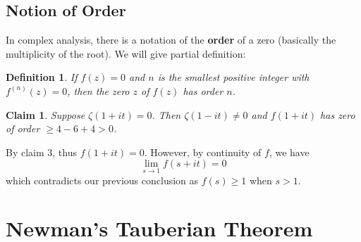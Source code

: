 \documentclass[12pt]{article}
\newtheorem*{definition}{Definition}
\newtheorem{claim}{Claim}
\begin{document}
\subsection{Notion of Order}
In complex analysis, there is a notation of the \textbf{order} of a zero (basically the multiplicity of the root). We will give partial definition:
\begin{definition}
If $f(z)=0$ and $n$ is the smallest positive integer with $f^{(n)}(z)=0$, then the zero $z$ of $f(z)$ has order $n$.
\end{definition}
\begin{claim}
    Suppose $\zeta(1 + it) = 0$. Then $\zeta(1 - it) \neq 0$ and $f(1 + it)$ has zero of order $\geq 4 - 6 + 4 > 0$.
\end{claim}
By claim 3, thus $f(1 + it) = 0$. However, by continuity of $f$, we have
\begin{equation}
    \lim_{s \rightarrow 1}f(s + it) = 0
\end{equation}
which contradicts our previous conclusion as $f(s) \geq 1$ when $s > 1$.

\section{Newman's Tauberian Theorem}
\end{document}
